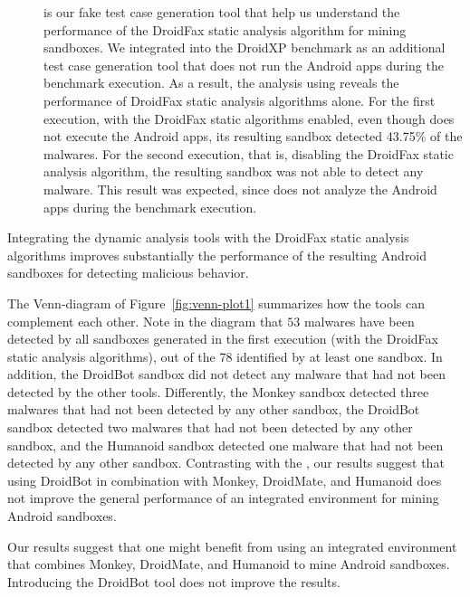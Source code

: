 \begin{description}
  \item[\joke] is our fake test case generation tool that help us understand the performance of the DroidFax static analysis algorithm for mining sandboxes. 
    We integrated \joke into the DroidXP benchmark as an additional test case generation tool that does not run the Android apps during the benchmark execution.
    As a result, the analysis using \joke reveals the performance of DroidFax static analysis algorithms alone. For the first execution, with the DroidFax static
    algorithms enabled, even though \joke does not execute the Android apps, its resulting sandbox detected 43.75\% of the malwares. For the second execution,
    that is, disabling the DroidFax static analysis algorithm, the resulting \joke sandbox was not able to detect any malware. This result
    was expected, since \joke does not analyze the Android apps during the benchmark execution.

\end{description}


\begin{finding}
  Integrating the dynamic analysis tools
  with the DroidFax static analysis algorithms
  improves substantially the performance
  of the resulting Android sandboxes for
  detecting malicious behavior. 
\end{finding}
 
The Venn-diagram of Figure~\ref{fig:venn-plot1}
summarizes how the tools can complement each other.
Note in the diagram that $53$ malwares have been detected
by all sandboxes generated in the first execution (with the DroidFax static analysis algorithms),
out of the 78 identified by at least one sandbox. In addition, the DroidBot sandbox did not detect
any malware that had not been detected by the other tools. Differently, the Monkey sandbox detected
three malwares that had not been detected by any other sandbox, the DroidBot sandbox detected two malwares
that had not been detected by any other sandbox, and the Humanoid sandbox detected one malware that had not
been detected by any other sandbox.  Contrasting with the \blls,
our results suggest that using DroidBot in combination with Monkey, DroidMate, and Humanoid
does not improve the general performance of an integrated environment for mining
Android sandboxes.

\begin{finding}
  Our results suggest that one might benefit from using  an integrated
  environment that combines Monkey, DroidMate, and Humanoid to
  mine Android sandboxes. Introducing the DroidBot 
  tool does not improve the results.
\end{finding}


